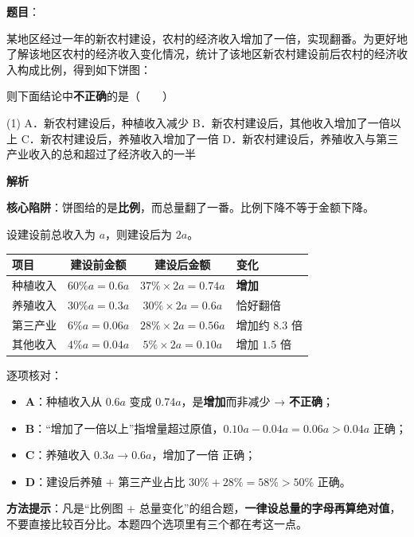 \begin{answer}

\textbf{题目}：

某地区经过一年的新农村建设，农村的经济收入增加了一倍，实现翻番。为更好地了解该地区农村的经济收入变化情况，统计了该地区新农村建设前后农村的经济收入构成比例，得到如下饼图：
\nopagebreak[4]
\begin{center}\end{center}
\nopagebreak[4]
则下面结论中\textbf{不正确}的是\mbox{（　　）}

\begin{gkopts}(1)
\task A．新农村建设后，种植收入减少
\task B．新农村建设后，其他收入增加了一倍以上
\task C．新农村建设后，养殖收入增加了一倍
\task D．新农村建设后，养殖收入与第三产业收入的总和超过了经济收入的一半
\end{gkopts}

\textbf{解析}

\textbf{核心陷阱}：饼图给的是\textbf{比例}，而总量翻了一番。比例下降不等于金额下降。

设建设前总收入为 $a$，则建设后为 $2a$。

\begin{center}
\begin{tabular}{lccl}
\toprule
项目 & 建设前金额 & 建设后金额 & 变化 \\
\midrule
种植收入 & $60\%a=0.6a$ & $37\%\times2a=0.74a$ & \textbf{增加} \\
养殖收入 & $30\%a=0.3a$ & $30\%\times2a=0.6a$ & 恰好翻倍 \\
第三产业 & $6\%a=0.06a$ & $28\%\times2a=0.56a$ & 增加约 $8.3$ 倍 \\
其他收入 & $4\%a=0.04a$ & $5\%\times2a=0.10a$ & 增加 $1.5$ 倍 \\
\bottomrule
\end{tabular}
\end{center}

逐项核对：

\begin{itemize}
\item \textbf{A}：种植收入从 $0.6a$ 变成 $0.74a$，是\textbf{增加}而非减少 → \textbf{不正确}；
\item \textbf{B}：“增加了一倍以上”指增量超过原值，$0.10a-0.04a=0.06a>0.04a$  正确；
\item \textbf{C}：养殖收入 $0.3a\to0.6a$，增加了一倍  正确；
\item \textbf{D}：建设后养殖 $+$ 第三产业占比 $30\%+28\%=58\%>50\%$  正确。
\end{itemize}

\begin{gktip}
\textbf{方法提示}：凡是“比例图 + 总量变化”的组合题，\textbf{一律设总量的字母再算绝对值}，不要直接比较百分比。本题四个选项里有三个都在考这一点。
\end{gktip}


\par\medskip

\end{answer}
